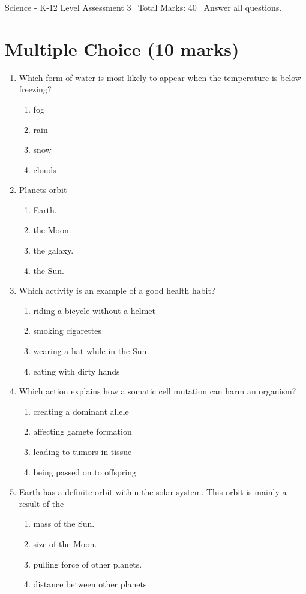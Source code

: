 \documentclass[12pt]{article}
\begin{document}
\begin{center}
Science - K-12 Level Assessment 3 \
Total Marks: 40 \
Answer all questions.
\end{center}

\section*{Multiple Choice (10 marks)}
\begin{enumerate}[label=\arabic*.]
\item Which form of water is most likely to appear when the temperature is below freezing?
\begin{enumerate}[label=(\alph*)]
    \item fog
    \item rain
    \item snow
    \item clouds
\end{enumerate}
\item Planets orbit
\begin{enumerate}[label=(\alph*)]
    \item Earth.
    \item the Moon.
    \item the galaxy.
    \item the Sun.
\end{enumerate}
\item Which activity is an example of a good health habit?
\begin{enumerate}[label=(\alph*)]
    \item riding a bicycle without a helmet
    \item smoking cigarettes
    \item wearing a hat while in the Sun
    \item eating with dirty hands
\end{enumerate}
\item Which action explains how a somatic cell mutation can harm an organism?
\begin{enumerate}[label=(\alph*)]
    \item creating a dominant allele
    \item affecting gamete formation
    \item leading to tumors in tissue
    \item being passed on to offspring
\end{enumerate}
\item Earth has a definite orbit within the solar system. This orbit is mainly a result of the
\begin{enumerate}[label=(\alph*)]
    \item mass of the Sun.
    \item size of the Moon.
    \item pulling force of other planets.
    \item distance between other planets.
\end{enumerate}
\end{enumerate}
\end{document}
